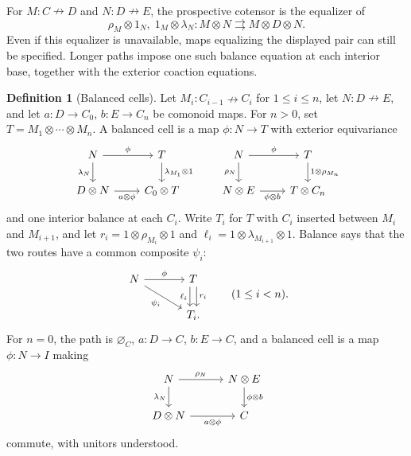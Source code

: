 \documentclass[11pt,reqno]{amsart}
\theoremstyle{plain}
\theoremstyle{definition}
\newtheorem{definition}[theorem]{Definition}
\theoremstyle{remark}
\numberwithin{equation}{section}
\newcommand{\harr}{\mathrel{\nrightarrow}}
\newcommand{\emp}[1]{\varnothing_{#1}}
\begin{document}
For $M:C\harr D$ and $N:D\harr E$, the prospective cotensor
is the equalizer of
\[
 \rho_M\otimes1_N,\;1_M\otimes\lambda_N:
 M\otimes N\rightrightarrows M\otimes D\otimes N.
\]
Even if this equalizer is unavailable, maps equalizing the displayed pair
can still be specified. Longer paths impose one such balance equation
at each interior base, together with the exterior coaction equations.

\begin{definition}[Balanced cells]\label{def:balanced}
Let $M_i:C_{i-1}\harr C_i$ for $1\leq i\leq n$, let
$N:D\harr E$, and let $a:D\to C_0$, $b:E\to C_n$ be comonoid
maps. For $n>0$, set $T=M_1\otimes\cdots\otimes M_n$. A balanced
cell is a map $\phi:N\to T$ with exterior equivariance
\begin{equation}\label{eq:exterior}
\begin{tikzcd}[column sep=2.3em]
N \arrow[r,"\phi"] \arrow[d,"\lambda_N"'] &
T \arrow[d,"\lambda_{M_1}\otimes1"]\\
D\otimes N \arrow[r,"a\otimes\phi"'] & C_0\otimes T
\end{tikzcd}
\qquad
\begin{tikzcd}[column sep=2.3em]
N \arrow[r,"\phi"] \arrow[d,"\rho_N"'] &
T \arrow[d,"1\otimes\rho_{M_n}"]\\
N\otimes E \arrow[r,"\phi\otimes b"'] & T\otimes C_n
\end{tikzcd}
\end{equation}
and one interior balance at each $C_i$. Write $T_i$ for $T$ with
$C_i$ inserted between $M_i$ and $M_{i+1}$, and let
$r_i=1\otimes\rho_{M_i}\otimes1$ and
$\ell_i=1\otimes\lambda_{M_{i+1}}\otimes1$. Balance says that
the two routes have a common composite $\psi_i$:
\begin{equation}\label{eq:balance}
\begin{tikzcd}[column sep=3.4em]
N \arrow[r,"\phi"] \arrow[dr,"\psi_i"'] &
T \arrow[d,shift left=.7ex,"r_i"]
  \arrow[d,shift right=.7ex,"\ell_i"']\\
& T_i.
\end{tikzcd}
\qquad (1\leq i<n).
\end{equation}
For $n=0$, the path is $\emp C$, $a:D\to C$, $b:E\to C$, and
a balanced cell is a map $\phi:N\to I$ making
\begin{equation}\label{eq:nullbalance}
\begin{tikzcd}[column sep=3em]
N \arrow[r,"\rho_N"] \arrow[d,"\lambda_N"'] &
N\otimes E \arrow[d,"\phi\otimes b"]\\
D\otimes N \arrow[r,"a\otimes\phi"'] & C
\end{tikzcd}
\end{equation}
commute, with unitors understood.
\end{definition}
\end{document}

